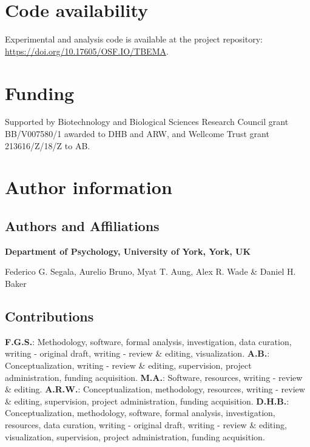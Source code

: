 \documentclass[
]{article}
\begin{document}
\hypertarget{code-availability}{%
\section{Code availability}\label{code-availability}}

Experimental and analysis code is available at the project repository: \url{https://doi.org/10.17605/OSF.IO/TBEMA}.

\hypertarget{funding}{%
\section{Funding}\label{funding}}

Supported by Biotechnology and Biological Sciences Research Council grant BB/V007580/1 awarded to DHB and ARW, and Wellcome Trust grant 213616/Z/18/Z to AB.

\hypertarget{author-information}{%
\section{Author information}\label{author-information}}

\hypertarget{authors-and-affiliations}{%
\subsection{Authors and Affiliations}\label{authors-and-affiliations}}

\textbf{Department of Psychology, University of York, York, UK}

Federico G. Segala, Aurelio Bruno, Myat T. Aung, Alex R. Wade \& Daniel H. Baker

\hypertarget{contributions}{%
\subsection{Contributions}\label{contributions}}

\textbf{F.G.S.}: Methodology, software, formal analysis, investigation, data curation, writing - original draft, writing - review \& editing, visualization. \textbf{A.B.}: Conceptualization, writing - review \& editing, supervision, project administration, funding acquisition. \textbf{M.A.}: Software, resources, writing - review \& editing. \textbf{A.R.W.}: Conceptualization, methodology, resources, writing - review \& editing, supervision, project administration, funding acquisition. \textbf{D.H.B.}: Conceptualization, methodology, software, formal analysis, investigation, resources, data curation, writing - original draft, writing - review \& editing, visualization, supervision, project administration, funding acquisition.
\end{document}

